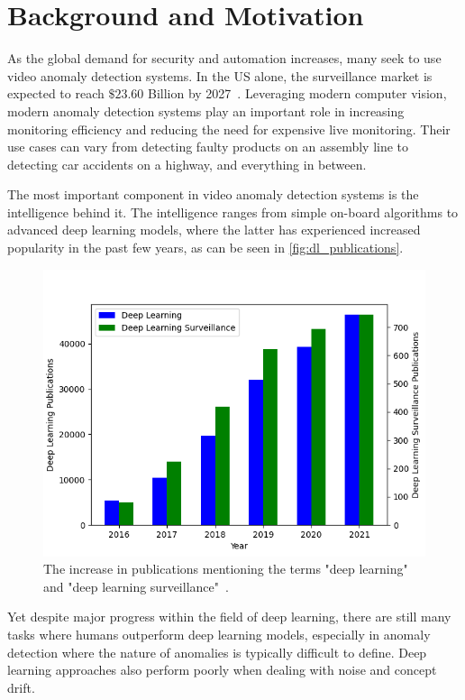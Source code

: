 \section{Background and Motivation}
As the global demand for security and automation increases, many seek to use video anomaly detection systems. In the US alone, the surveillance market is expected to reach $\$23.60$ Billion by 2027~\cite{us_video_stats}. Leveraging modern computer vision, modern anomaly detection systems play an important role in increasing monitoring efficiency and reducing the need for expensive live monitoring. Their use cases can vary from detecting faulty products on an assembly line to detecting car accidents on a highway, and everything in between.
\par
The most important component in video anomaly detection systems is the intelligence behind it. The intelligence ranges from simple on-board algorithms to advanced deep learning models, where the latter has experienced increased popularity in the past few years, as can be seen in \autoref{fig:dl_publications}.\par
\begin{figure}[htb]
    \centering
    \includegraphics[width=\linewidth]{resources/introduction/publications_graph}
    \caption[Publications Increase Comparison]{The increase in publications mentioning the terms "deep learning" and "deep learning surveillance"~\cite{deep_learning_surveillance_stats}.}
    \label{fig:dl_publications}
\end{figure}
Yet despite major progress within the field of deep learning, there are still many tasks where humans outperform deep learning models, especially in anomaly detection where the nature of anomalies is typically difficult to define. Deep learning approaches also perform poorly when dealing with noise and concept drift.
